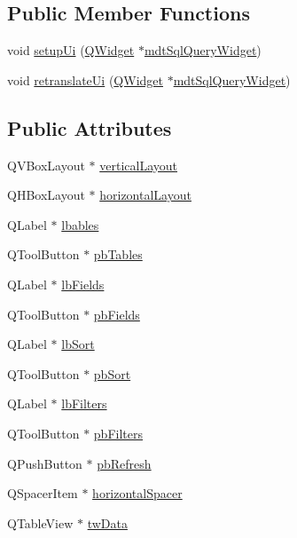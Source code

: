 \subsection*{Public Member Functions}
\begin{DoxyCompactItemize}
\item 
void \hyperlink{class_ui__mdt_sql_query_widget_a9ae4657102919bba47ca1bab699a4ee3}{setup\-Ui} (\hyperlink{class_q_widget}{Q\-Widget} $\ast$\hyperlink{classmdt_sql_query_widget}{mdt\-Sql\-Query\-Widget})
\item 
void \hyperlink{class_ui__mdt_sql_query_widget_af8270a7f65d1d4a615d36681655bfb7e}{retranslate\-Ui} (\hyperlink{class_q_widget}{Q\-Widget} $\ast$\hyperlink{classmdt_sql_query_widget}{mdt\-Sql\-Query\-Widget})
\end{DoxyCompactItemize}
\subsection*{Public Attributes}
\begin{DoxyCompactItemize}
\item 
Q\-V\-Box\-Layout $\ast$ \hyperlink{class_ui__mdt_sql_query_widget_aa132fe9443034e8c453c3663cb8a3b86}{vertical\-Layout}
\item 
Q\-H\-Box\-Layout $\ast$ \hyperlink{class_ui__mdt_sql_query_widget_a531b35390589ac484e2882bf135c39c7}{horizontal\-Layout}
\item 
Q\-Label $\ast$ \hyperlink{class_ui__mdt_sql_query_widget_a69530ce753db3cab9d7ab82f563f866d}{lbables}
\item 
Q\-Tool\-Button $\ast$ \hyperlink{class_ui__mdt_sql_query_widget_a6a5136ed52cadc20027117ee6cba892e}{pb\-Tables}
\item 
Q\-Label $\ast$ \hyperlink{class_ui__mdt_sql_query_widget_a19e07473864132421f40bdae895d3cd0}{lb\-Fields}
\item 
Q\-Tool\-Button $\ast$ \hyperlink{class_ui__mdt_sql_query_widget_a218433a4d53dc34a34462c16b435cab4}{pb\-Fields}
\item 
Q\-Label $\ast$ \hyperlink{class_ui__mdt_sql_query_widget_a8fc965ad1ddbaf0e8d9395cb99ffc3f6}{lb\-Sort}
\item 
Q\-Tool\-Button $\ast$ \hyperlink{class_ui__mdt_sql_query_widget_aae8e5865d63a67f4377058ba0af523e9}{pb\-Sort}
\item 
Q\-Label $\ast$ \hyperlink{class_ui__mdt_sql_query_widget_a4c009901e7d5ee9b94f30c42288342db}{lb\-Filters}
\item 
Q\-Tool\-Button $\ast$ \hyperlink{class_ui__mdt_sql_query_widget_a87b20818afed1b534eb6d872044a953b}{pb\-Filters}
\item 
Q\-Push\-Button $\ast$ \hyperlink{class_ui__mdt_sql_query_widget_a117cc61c4f8ab6342e54479353cf333b}{pb\-Refresh}
\item 
Q\-Spacer\-Item $\ast$ \hyperlink{class_ui__mdt_sql_query_widget_a78a8f55b56a47d05cd233c960c28b8d7}{horizontal\-Spacer}
\item 
Q\-Table\-View $\ast$ \hyperlink{class_ui__mdt_sql_query_widget_adfcef96e9d51747e123ae65ffa30e2b7}{tw\-Data}
\end{DoxyCompactItemize}


